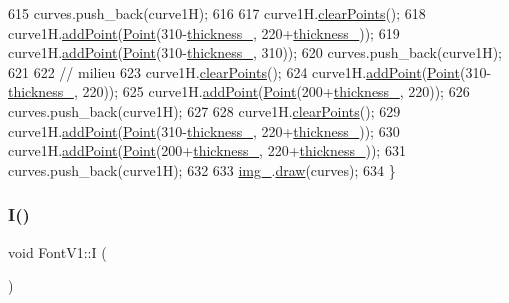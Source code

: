 \begin{DoxyCode}
615     curves.push\_back(curve1H);
616 
617     curve1H.\mbox{\hyperlink{class_bezier_curve_a0ba8ce66d5af5971ae6a1b506029728e}{clearPoints}}();
618     curve1H.\mbox{\hyperlink{class_bezier_curve_a38d16c18b36ae45619b05e26e226cf34}{addPoint}}(\mbox{\hyperlink{class_point}{Point}}(310-\mbox{\hyperlink{class_font_v1_aed8040e76be9a52833627b92f0fb4e5f}{thickness\_}}, 220+\mbox{\hyperlink{class_font_v1_aed8040e76be9a52833627b92f0fb4e5f}{thickness\_}}));
619     curve1H.\mbox{\hyperlink{class_bezier_curve_a38d16c18b36ae45619b05e26e226cf34}{addPoint}}(\mbox{\hyperlink{class_point}{Point}}(310-\mbox{\hyperlink{class_font_v1_aed8040e76be9a52833627b92f0fb4e5f}{thickness\_}}, 310));
620     curves.push\_back(curve1H);
621 
622     \textcolor{comment}{// milieu}
623     curve1H.\mbox{\hyperlink{class_bezier_curve_a0ba8ce66d5af5971ae6a1b506029728e}{clearPoints}}();
624     curve1H.\mbox{\hyperlink{class_bezier_curve_a38d16c18b36ae45619b05e26e226cf34}{addPoint}}(\mbox{\hyperlink{class_point}{Point}}(310-\mbox{\hyperlink{class_font_v1_aed8040e76be9a52833627b92f0fb4e5f}{thickness\_}}, 220));
625     curve1H.\mbox{\hyperlink{class_bezier_curve_a38d16c18b36ae45619b05e26e226cf34}{addPoint}}(\mbox{\hyperlink{class_point}{Point}}(200+\mbox{\hyperlink{class_font_v1_aed8040e76be9a52833627b92f0fb4e5f}{thickness\_}}, 220));
626     curves.push\_back(curve1H);
627 
628     curve1H.\mbox{\hyperlink{class_bezier_curve_a0ba8ce66d5af5971ae6a1b506029728e}{clearPoints}}();
629     curve1H.\mbox{\hyperlink{class_bezier_curve_a38d16c18b36ae45619b05e26e226cf34}{addPoint}}(\mbox{\hyperlink{class_point}{Point}}(310-\mbox{\hyperlink{class_font_v1_aed8040e76be9a52833627b92f0fb4e5f}{thickness\_}}, 220+\mbox{\hyperlink{class_font_v1_aed8040e76be9a52833627b92f0fb4e5f}{thickness\_}}));
630     curve1H.\mbox{\hyperlink{class_bezier_curve_a38d16c18b36ae45619b05e26e226cf34}{addPoint}}(\mbox{\hyperlink{class_point}{Point}}(200+\mbox{\hyperlink{class_font_v1_aed8040e76be9a52833627b92f0fb4e5f}{thickness\_}}, 220+\mbox{\hyperlink{class_font_v1_aed8040e76be9a52833627b92f0fb4e5f}{thickness\_}}));
631     curves.push\_back(curve1H);
632 
633     \mbox{\hyperlink{class_font_v1_a00569e3e3c4b70f437b63f396f735fb0}{img\_}}.\mbox{\hyperlink{class_image_a8d162f3cab956131d58708c09aa560b0}{draw}}(curves);
634 \}
\end{DoxyCode}
\mbox{\label{class_font_v1_aab86d5ae867a26e0384c919f82f0bcf1}} 
\subsubsection{\texorpdfstring{I()}{I()}}
{\footnotesize\ttfamily void Font\+V1\+::I (\begin{DoxyParamCaption}{ }\end{DoxyParamCaption})}




